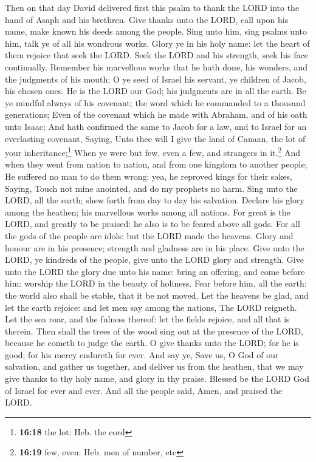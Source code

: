  Then on that day David delivered first this psalm to
thank the LORD into the hand of Asaph and his brethren. 
Give thanks unto the LORD, call upon his name, make known his deeds
among the people.  Sing unto him, sing psalms unto him,
talk ye of all his wondrous works.  Glory ye in his holy
name: let the heart of them rejoice that seek the LORD. 
Seek the LORD and his strength, seek his face continually.
 Remember his marvellous works that he hath done, his
wonders, and the judgments of his mouth;  O ye seed of
Israel his servant, ye children of Jacob, his chosen ones.
 He is the LORD our God; his judgments are in all the
earth.  Be ye mindful always of his covenant; the word
which he commanded to a thousand generations;  Even of
the covenant which he made with Abraham, and of his oath unto Isaac;
 And hath confirmed the same to Jacob for a law, and to
Israel for an everlasting covenant,  Saying, Unto thee
will I give the land of Canaan, the lot of your inheritance;\footnote{\textbf{16:18}
  the lot: Heb. the cord}  When ye were but few, even a
few, and strangers in it.\footnote{\textbf{16:19} few, even: Heb. men of
  number, etc}  And when they went from nation to nation,
and from one kingdom to another people;  He suffered no
man to do them wrong: yea, he reproved kings for their sakes,
 Saying, Touch not mine anointed, and do my prophets no
harm.  Sing unto the LORD, all the earth; shew forth from
day to day his salvation.  Declare his glory among the
heathen; his marvellous works among all nations.  For
great is the LORD, and greatly to be praised: he also is to be feared
above all gods.  For all the gods of the people are
idols: but the LORD made the heavens.  Glory and honour
are in his presence; strength and gladness are in his place.
 Give unto the LORD, ye kindreds of the people, give unto
the LORD glory and strength.  Give unto the LORD the
glory due unto his name: bring an offering, and come before him: worship
the LORD in the beauty of holiness.  Fear before him, all
the earth: the world also shall be stable, that it be not moved.
 Let the heavens be glad, and let the earth rejoice: and
let men say among the nations, The LORD reigneth.  Let
the sea roar, and the fulness thereof: let the fields rejoice, and all
that is therein.  Then shall the trees of the wood sing
out at the presence of the LORD, because he cometh to judge the earth.
 O give thanks unto the LORD; for he is good; for his
mercy endureth for ever.  And say ye, Save us, O God of
our salvation, and gather us together, and deliver us from the heathen,
that we may give thanks to thy holy name, and glory in thy praise.
 Blessed be the LORD God of Israel for ever and ever. And
all the people said, Amen, and praised the LORD.

